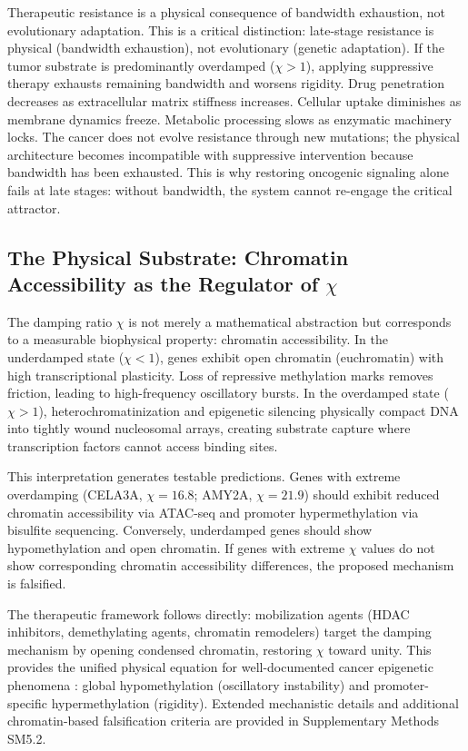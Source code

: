 \documentclass[11pt,letterpaper]{article}
\begin{document}
Therapeutic resistance is a physical consequence of bandwidth exhaustion, not evolutionary adaptation. This is a critical distinction: late-stage resistance is physical (bandwidth exhaustion), not evolutionary (genetic adaptation). If the tumor substrate is predominantly overdamped ($\chi > 1$), applying suppressive therapy exhausts remaining bandwidth and worsens rigidity. Drug penetration decreases as extracellular matrix stiffness increases. Cellular uptake diminishes as membrane dynamics freeze. Metabolic processing slows as enzymatic machinery locks. The cancer does not evolve resistance through new mutations; the physical architecture becomes incompatible with suppressive intervention because bandwidth has been exhausted. This is why restoring oncogenic signaling alone fails at late stages: without bandwidth, the system cannot re-engage the critical attractor.

\subsection{The Physical Substrate: Chromatin Accessibility as the Regulator of $\chi$}

The damping ratio $\chi$ is not merely a mathematical abstraction but corresponds to a measurable biophysical property: chromatin accessibility. In the underdamped state ($\chi < 1$), genes exhibit open chromatin (euchromatin) with high transcriptional plasticity. Loss of repressive methylation marks removes friction, leading to high-frequency oscillatory bursts. In the overdamped state ($\chi > 1$), heterochromatinization and epigenetic silencing physically compact DNA into tightly wound nucleosomal arrays, creating substrate capture where transcription factors cannot access binding sites.

This interpretation generates testable predictions. Genes with extreme overdamping (CELA3A, $\chi = 16.8$; AMY2A, $\chi = 21.9$) should exhibit reduced chromatin accessibility via ATAC-seq \cite{Buenrostro2013} and promoter hypermethylation via bisulfite sequencing. Conversely, underdamped genes should show hypomethylation and open chromatin. If genes with extreme $\chi$ values do not show corresponding chromatin accessibility differences, the proposed mechanism is falsified.

The therapeutic framework follows directly: mobilization agents (HDAC inhibitors, demethylating agents, chromatin remodelers) target the damping mechanism by opening condensed chromatin, restoring $\chi$ toward unity. This provides the unified physical equation for well-documented cancer epigenetic phenomena \cite{Bernstein2007,Feinberg2016}: global hypomethylation (oscillatory instability) and promoter-specific hypermethylation (rigidity). Extended mechanistic details and additional chromatin-based falsification criteria are provided in Supplementary Methods SM5.2.
\end{document}
